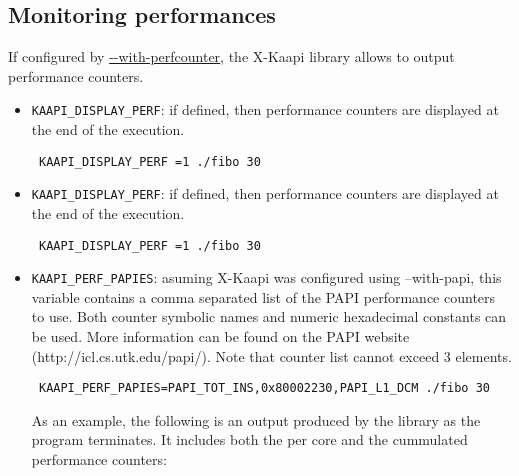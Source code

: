 \documentclass{article}
\newcommand{\kaapi}{\textsc{X}-Kaapi\xspace}
\begin{document}
\subsection{Monitoring performances}
If configured by \url{--with-perfcounter}, the \kaapi library allows to output performance counters.

\begin{itemize}
\item \verb+KAAPI_DISPLAY_PERF+: if defined, then performance counters are displayed at the end of the execution.
\begin{verbatim}
 KAAPI_DISPLAY_PERF =1 ./fibo 30
\end{verbatim}

\item \verb+KAAPI_DISPLAY_PERF+: if defined, then performance counters are displayed at the end of the execution.
\begin{verbatim}
 KAAPI_DISPLAY_PERF =1 ./fibo 30
\end{verbatim}

\item \verb+KAAPI_PERF_PAPIES+: asuming \kaapi was configured using --with-papi, this variable contains a comma separated list of the PAPI performance counters to use. Both counter symbolic names and numeric hexadecimal constants can be used. More information can be found on the PAPI website (http://icl.cs.utk.edu/papi/). Note that counter list cannot exceed 3 elements.
\begin{verbatim}
 KAAPI_PERF_PAPIES=PAPI_TOT_INS,0x80002230,PAPI_L1_DCM ./fibo 30
\end{verbatim}

As an example, the following is an output produced by the library as the program terminates. It includes both the per core and the cummulated performance counters:


\end{itemize}
\end{document}
